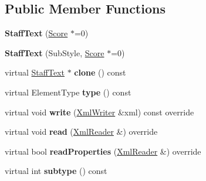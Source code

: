 \subsection*{Public Member Functions}
\begin{DoxyCompactItemize}
\item 
\mbox{\label{class_ms_1_1_staff_text_a73957d458f6ca6ab6d15729a8744ba53}} 
{\bfseries Staff\+Text} (\hyperlink{class_ms_1_1_score}{Score} $\ast$=0)
\item 
\mbox{\label{class_ms_1_1_staff_text_adff788b27555d483721e7809d6311a6e}} 
{\bfseries Staff\+Text} (Sub\+Style, \hyperlink{class_ms_1_1_score}{Score} $\ast$=0)
\item 
\mbox{\label{class_ms_1_1_staff_text_a808000d6747dbfb287c79262c8fdbc31}} 
virtual \hyperlink{class_ms_1_1_staff_text}{Staff\+Text} $\ast$ {\bfseries clone} () const
\item 
\mbox{\label{class_ms_1_1_staff_text_af80799865e4837895ee0d5869d6152fe}} 
virtual Element\+Type {\bfseries type} () const
\item 
\mbox{\label{class_ms_1_1_staff_text_a84ddfc30924accff36bc77652aad7a50}} 
virtual void {\bfseries write} (\hyperlink{class_ms_1_1_xml_writer}{Xml\+Writer} \&xml) const override
\item 
\mbox{\label{class_ms_1_1_staff_text_a9971bb257812900e195b5c30c7bc8c78}} 
virtual void {\bfseries read} (\hyperlink{class_ms_1_1_xml_reader}{Xml\+Reader} \&) override
\item 
\mbox{\label{class_ms_1_1_staff_text_a141bbb014021bf0a3df8844835b31d12}} 
virtual bool {\bfseries read\+Properties} (\hyperlink{class_ms_1_1_xml_reader}{Xml\+Reader} \&) override
\item 
\mbox{\label{class_ms_1_1_staff_text_acde3b5e1b19a3ed327ed6799d6ad7829}} 
virtual int {\bfseries subtype} () const
\item 
\mbox{\label{class_ms_1_1_staff_text_a5a01b7329ca158aeea8dc24f5a043f1b}} 

\end{DoxyCompactItemize}
